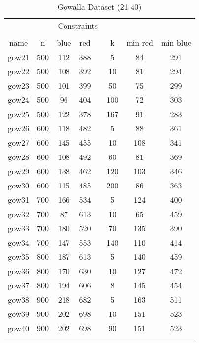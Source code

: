 \begin{table}[H]
    \centering
    \scriptsize
    \begin{tabular}{cccccccc}
        \firsthline
        \multicolumn{4}{c}{Graph Details} & & \multicolumn{3}{c}{Constraints}\\
        \cline{1-4} \cline{6-8}\\
         name &  n & blue & red & & k & min red & min blue\\
         \hline
        gow21 & 500 & 112 & 388 & & 5 & 84 & 291\\
        gow22 & 500 & 108 & 392 & & 10 & 81 & 294\\
        gow23 & 500 & 101 & 399 & & 50 & 75 & 299\\
        gow24 & 500 & 96 & 404 & & 100 & 72 & 303\\
        gow25 & 500 & 122 & 378 & & 167 & 91 & 283\\
        gow26 & 600 & 118 & 482 & & 5 & 88 & 361\\
        gow27 & 600 & 145 & 455 & & 10 & 108 & 341\\
        gow28 & 600 & 108 & 492 & & 60 & 81 & 369\\
        gow29 & 600 & 138 & 462 & & 120 & 103 & 346\\
        gow30 & 600 & 115 & 485 & & 200 & 86 & 363\\
        gow31 & 700 & 166 & 534 & & 5 & 124 & 400\\
        gow32 & 700 & 87 & 613 & & 10 & 65 & 459\\
        gow33 & 700 & 180 & 520 & & 70 & 135 & 390\\
        gow34 & 700 & 147 & 553 & & 140 & 110 & 414\\
        gow35 & 800 & 187 & 613 & & 5 & 140 & 459\\
        gow36 & 800 & 170 & 630 & & 10 & 127 & 472\\
        gow37 & 800 & 194 & 606 & & 8 & 145 & 454\\
        gow38 & 900 & 218 & 682 & & 5 & 163 & 511\\
        gow39 & 900 & 202 & 698 & & 10 & 151 & 523\\
        gow40 & 900 & 202 & 698 & & 90 & 151 & 523\\
        \lasthline
    \end{tabular}
    \caption{Gowalla Dataset (21-40)}
    \label{tab:gowalla_dataset_2}
    \normalsize
\end{table}